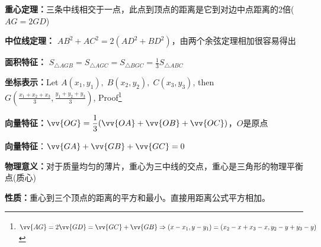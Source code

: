 \documentclass[../main.tex]{subfiles}
\begin{document}
\textbf{重心定理：}三条中线相交于一点，此点到顶点的距离是它到对边中点距离的2倍($AG=2GD$)

\textbf{中位线定理：} $AB^2+AC^2=2(AD^2+BD^2)$，由两个余弦定理相加很容易得出

\textbf{面积特征：} $S_{\triangle AGB} = S_{\triangle AGC} = S_{\triangle BGC}=\frac{1}{3}S_{\triangle ABC}$

\textbf{坐标表示：}Let $A(x_1,y_1), \;B(x_2, y_2), \; C(x_3, y_3)$, then $\displaystyle G(\frac{x_1+x_2+x_3}{3}, \frac{y_1+y_2+y_3}{3})$,
Proof\footnote{$\vv{AG}=2\vv{GD}=\vv{GC}+\vv{GB} \Rightarrow (x-x_1, y-y_1)=(x_2-x+x_3-x, y_2-y+y_3-y)$}

\textbf{向量特征：}$\vv{OG} = \displaystyle \frac{1}{3}(\vv{OA}+\vv{OB}+\vv{OC})$，$O$是原点

\textbf{向量特征}：$\vv{GA} + \vv{GB} + \vv{GC}=0$

\textbf{物理意义：}对于质量均匀的薄片，重心为三中线的交点，重心是三角形的物理平衡点(质心)

\textbf{性质：}重心到三个顶点的距离的平方和最小。直接用距离公式平方相加。
\end{document}
